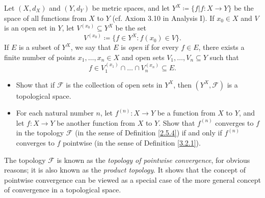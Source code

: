 \begin{exercise}\label{ex 3.4.4}
    Let \((X, d_X)\) and \((Y, d_Y)\) be metric spaces, and let \(Y^X \coloneqq \{f | f : X \to Y \}\) be the space of all functions from \(X\) to \(Y\)
    (cf. Axiom 3.10 in Analysis I).
    If \(x_0 \in X\) and \(V\) is an open set in \(Y\), let \(V^{(x_0)} \subseteq Y^X\) be the set
    \[
        V^{(x_0)} \coloneqq \big\{f \in Y^X : f(x_0) \in V\big\}.
    \]
    If \(E\) is a subset of \(Y^X\), we say that \(E\) is \emph{open} if for every \(f \in E\), there exists a finite number of points \(x_1, \dots, x_n \in X\) and open sets \(V_1, \dots, V_n \subseteq Y\) such that
    \[
        f \in V_1^{(x_1)} \cap \dots \cap V_n^{(x_n)} \subseteq E.
    \]
    \begin{itemize}
        \item Show that if \(\mathcal{F}\) is the collection of open sets in \(Y^X\), then \((Y^X , \mathcal{F})\) is a topological space.
        \item For each natural number \(n\), let \(f^{(n)} : X \to Y\) be a function from \(X\) to \(Y\), and let \(f : X \to Y\) be another function from \(X\) to \(Y\).
              Show that \(f^{(n)}\) converges to \(f\) in the topology \(\mathcal{F}\) (in the sense of Definition \ref{2.5.4}) if and only if \(f^{(n)}\) converges to \(f\) pointwise (in the sense of Definition \ref{3.2.1}).
    \end{itemize}
    The topology \(\mathcal{F}\) is known as the \emph{topology of pointwise convergence}, for obvious reasons;
    it is also known as the \emph{product topology}.
    It shows that the concept of pointwise convergence can be viewed as a special case of the more general concept of convergence in a topological space.
\end{exercise}

